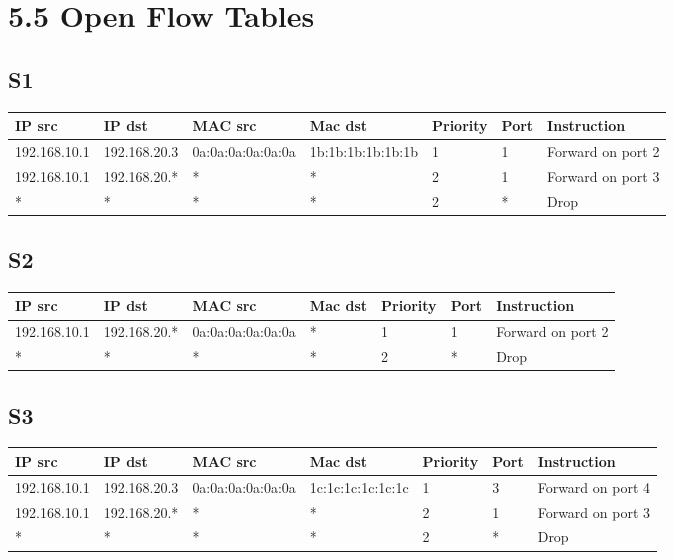 \documentclass{article}
\begin{document}
	\section*{5.5 Open Flow Tables}
	\begin{adjustwidth}{2em}{2em}
		\subsection*{S1}
		\begin{adjustwidth}{-4em}{}
			\begin{tabular}{|l|l|l|l|l|l|l|}
				\hline
				IP src & IP dst & MAC src & Mac dst & Priority & Port & Instruction \\
				\hline
				192.168.10.1 & 192.168.20.3 & 0a:0a:0a:0a:0a:0a & 1b:1b:1b:1b:1b:1b & 1 & 1 & Forward on port 2 \\
				\hline
				192.168.10.1 & 192.168.20.* & * & * & 2 & 1 & Forward on port 3 \\
				\hline
				\* * & * & * & * & 2 & * & Drop \\
				\hline
			\end{tabular}
		\end{adjustwidth}
		\subsection*{S2}
		\begin{adjustwidth}{-4em}{}
			\begin{tabular}{|l|l|l|l|l|l|l|}
				\hline
				IP src & IP dst & MAC src & Mac dst & Priority & Port & Instruction \\
				\hline
				192.168.10.1 & 192.168.20.* & 0a:0a:0a:0a:0a:0a & * & 1 & 1 & Forward on port 2 \\
				\hline
				\* * & * & * & * & 2 & * & Drop \\
				\hline
			\end{tabular}
		\end{adjustwidth}
		\subsection*{S3}
		\begin{adjustwidth}{-4em}{}
			\begin{tabular}{|l|l|l|l|l|l|l|}
				\hline
				IP src & IP dst & MAC src & Mac dst & Priority & Port & Instruction \\
				\hline
				192.168.10.1 & 192.168.20.3 & 0a:0a:0a:0a:0a:0a & 1c:1c:1c:1c:1c:1c & 1 & 3 & Forward on port 4 \\
				\hline
				192.168.10.1 & 192.168.20.* & * & * & 2 & 1 & Forward on port 3 \\
				\hline
				\* * & * & * & * & 2 & * & Drop \\
				\hline
			\end{tabular}
		\end{adjustwidth}

\end{adjustwidth}
\end{document}
